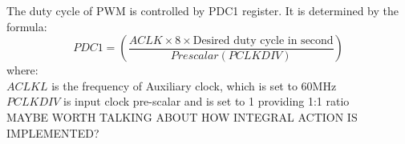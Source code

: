 The duty cycle of PWM is controlled by PDC1 register. It is determined by the formula\cite{picPWM}:
\[
    PDC1 = \left( \frac{ACLK\times 8\times \text{Desired duty cycle in second}}{Prescalar (PCLKDIV)} \right)
\]
where:\\
$ACLKL$ is the frequency of Auxiliary clock, which is set to 60MHz\\
$PCLKDIV$ is input clock pre-scalar and is set to 1 providing 1:1 ratio \\


MAYBE WORTH TALKING ABOUT HOW INTEGRAL ACTION IS IMPLEMENTED? 

\begin{comment}
    \subsection{System clock and Timer}
    dsPIC33E has internal clock which runs at 7.3728MHz. Built-in Phase Lock Loop (PLL) was used to increase the frequency of system clock. The clock was configured to the fastest frequency of 120MHz. 
    
    Timer 2 was configured as ADC triggering is available on TMR2. Timer count register gets incremented every rising edge of timer input clock. It is configured to take the internal clock running at 60MHz as timer source. The period of timer interrupt is controlled by PR2 (16bit) register. In order to trigger the interrupt at 10kHz, PR2 is set to:
    \begin{align*}
        PR2 
        & = \frac{F_{CY}}{PCLKDIV \times f_{desired}} \\
        & =  \frac{60MHz}{1 \times 10kHz} \\
        & = 6000 \text{ instruction cycles}
    \end{align*}
    where:
    $F_{CY}$ is the instruction clock cycle, which is half of system clock i.e. 60MHz\\
    $PCLKDIV$ is the input pre-scalar and is set to 1 providing 1:1 ratio.
        
    
    \subsection{ADC}
    As discussed in ADC section, two dedicated cores are used to measure the voltage at output and input at the same time. The conversion time of ADC is given by the formula \cite{picADC}:
    \begin{align*}
        T_{conversion} 
        & = 8 \times T_{coresrc} + ( resolution + 2.5 ) \times T_{adcore}\\
        & = 8 \cdot \frac{1}{60MHz} + (12 + 2.5) \frac{2}{60MHz}\\
        & = 620 \mu \text{ seconds}
    \end{align*}
       
    It is expected to take 620 $\mu$ seconds. When the conversion is complete, MCU sets Data Ready Status bit HIGH. These bits were checked in main loop to determine whether conversion results are ready. 
\end{comment}


